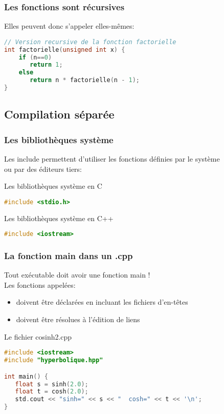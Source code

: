 \documentclass{beamer}
\begin{document}
\begin{frame}[fragile=singleslide,shrink=20]
\frametitle{Les fonctions sont récursives}
Elles peuvent donc s'appeler elles-mêmes:
\begin{lstlisting}[language=c++]
// Version recursive de la fonction factorielle
int factorielle(unsigned int x) {
    if (n==0) 
       return 1;
    else
       return n * factorielle(n - 1);
}
\end{lstlisting}
\end{frame}

\subsection{Compilation séparée}

\begin{frame}[fragile=singleslide,shrink=20]
\frametitle{Les bibliothèques système}
Les include permettent d'utiliser les fonctions définies par le système \\
ou par des éditeurs tiers:

\begin{block}{Les bibliothèques système en C}
\begin{lstlisting}[language=c++]
#include <stdio.h>
\end{lstlisting}
\end{block}

\begin{block}{Les bibliothèques système en C++}
\begin{lstlisting}[language=c++]
#include <iostream>
\end{lstlisting}
\end{block}

\end{frame}



\begin{frame}[fragile=singleslide,shrink=20]
\frametitle{La fonction main dans un .cpp}
Tout exécutable doit avoir une fonction main ! \\
Les fonctions appelées:
\begin{itemize}
\item{doivent être déclarées en incluant les fichiers d'en-têtes}
\item{doivent être résolues à l'édition de liens}
\end{itemize}

\begin{block}{Le fichier cosinh2.cpp}
\begin{lstlisting}[language=c++]
#include <iostream>
#include "hyperbolique.hpp"

int main() {
   float s = sinh(2.0);
   float t = cosh(2.0);
   std.cout << "sinh=" << s << "  cosh=" << t << '\n';
}
\end{lstlisting}
\end{block}
\end{frame}
\end{document}
